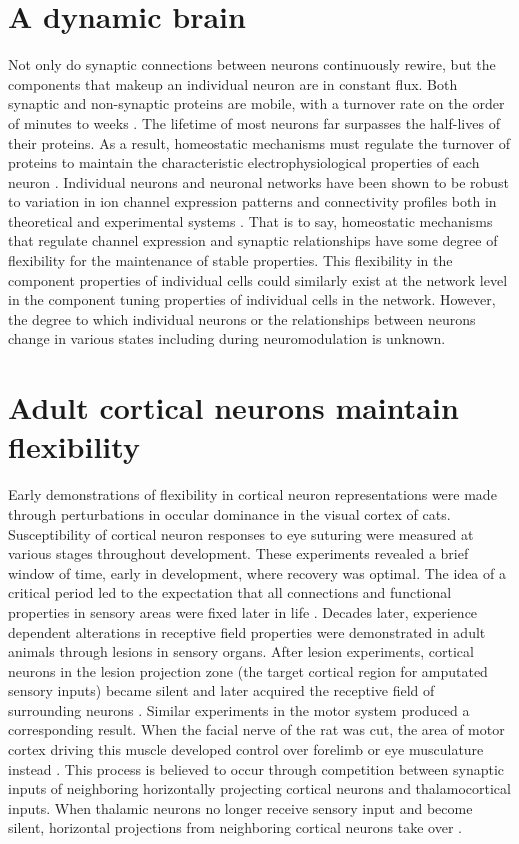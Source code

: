 \section{A dynamic brain}
Not only do synaptic connections between neurons continuously rewire, but the components that makeup an individual neuron are in constant flux. Both synaptic and non-synaptic proteins are mobile, with a turnover rate on the order of minutes to weeks \citep{Bredt2003, Hanus2013}. The lifetime of most neurons far surpasses the half-lives of their proteins. As a result, homeostatic mechanisms must regulate the turnover of proteins to maintain the characteristic electrophysiological properties of each neuron \citep{Marder2006}. Individual neurons and neuronal networks have been shown to be robust to variation in ion channel expression patterns and connectivity profiles both in theoretical and experimental systems \citep{Keck2013, Monier2003, Foster1993, Schulz2006, Taylor2006}. That is to say, homeostatic mechanisms that regulate channel expression and synaptic relationships have some degree of flexibility for the maintenance of stable properties. This flexibility in the component properties of individual cells could similarly exist at the network level in the component tuning properties of individual cells in the network. However, the degree to which individual neurons or the relationships between neurons change in various states including during neuromodulation is unknown.
 
\section{Adult cortical neurons maintain flexibility}
Early demonstrations of flexibility in cortical neuron representations were made through perturbations in occular dominance in the visual cortex of cats. Susceptibility of cortical neuron responses to eye suturing were measured at various stages throughout development. These experiments revealed a brief window of time, early in development, where recovery was optimal. The idea of a critical period led to the expectation that all connections and functional properties in sensory areas were fixed later in life \citep{Gilbert1990}.  Decades later, experience dependent alterations in receptive field properties were demonstrated in adult animals through lesions in sensory organs. After lesion experiments, cortical neurons in the lesion projection zone (the target cortical region for amputated sensory inputs) became silent and later acquired the receptive field of surrounding neurons \citep{Merzenich1984, Robertson1989, Kaas1990}. Similar experiments in the motor system produced a corresponding result. When the facial nerve of the rat was cut, the area of motor cortex driving this muscle developed control over forelimb or eye musculature instead \citep{Gilbert1992}. This process is believed to occur through competition between synaptic inputs of neighboring horizontally projecting cortical neurons and thalamocortical inputs. When thalamic neurons no longer receive sensory input and become silent, horizontal projections from neighboring cortical neurons take over \citep{Darian-Smith1994}. 

